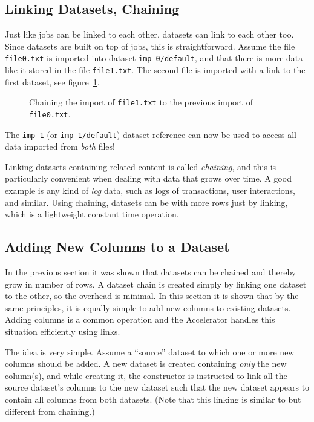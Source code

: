 \subsection{Linking Datasets, Chaining}

Just like jobs can be linked to each other, datasets can link to each
other too.  Since datasets are built on top of jobs, this is
straightforward.  Assume the file \texttt{file0.txt} is imported into
dataset \texttt{imp-0/default}, and that there is more data like it
stored in the file \texttt{file1.txt}.  The second file is imported
with a link to the first dataset, see
figure~\ref{fig:dataset_csvimport_chain}.
\begin{figure}[t]
  \begin{center}
    
    \caption{Chaining the import of \texttt{file1.txt} to the previous
      import of \texttt{file0.txt}.}
    \label{fig:dataset_csvimport_chain}
  \end{center}
\end{figure}
The \texttt{imp-1} (or \texttt{imp-1/default}) dataset reference can
now be used to access all data imported from \textsl{both} files!

Linking datasets containing related content is called \emph{chaining},
and this is particularly convenient when dealing with data that grows
over time.  A good example is any kind of \emph{log} data, such as
logs of transactions, user interactions, and similar.  Using chaining,
datasets can be with more rows just by linking, which is a lightweight
constant time operation.



\subsection{Adding New Columns to a Dataset}
In the previous section it was shown that datasets can be chained and
thereby grow in number of rows.  A dataset chain is created simply by
linking one dataset to the other, so the overhead is minimal.  In this
section it is shown that by the same principles, it is equally simple
to add new columns to existing datasets.  Adding columns is a common
operation and the Accelerator handles this situation efficiently using
links.

The idea is very simple.  Assume a ``source'' dataset to which one or
more new columns should be added.  A new dataset is created containing
\textsl{only} the new column(s), and while creating it, the
constructor is instructed to link all the source dataset's columns to
the new dataset such that the new dataset appears to contain all
columns from both datasets.  (Note that this linking is similar to but
different from chaining.)

